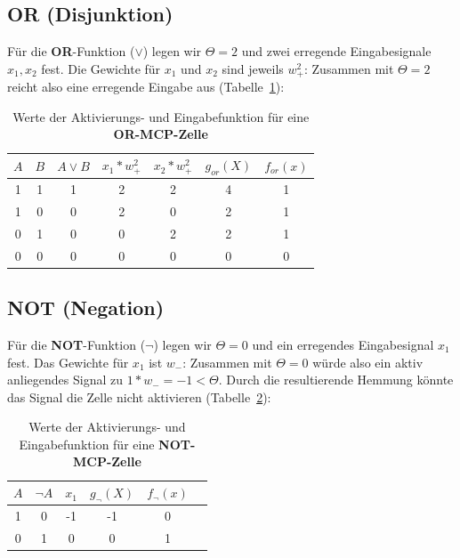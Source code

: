 {\subsection*{OR (Disjunktion)}

Für die \textbf{OR}-Funktion ($\lor$) legen wir $\Theta = 2$ und zwei erregende Eingabesignale $x_1, x_2$ fest. Die Gewichte für $x_1$ und $x_2$ sind jeweils $w^2_+$: Zusammen mit $\Theta = 2$ reicht also eine erregende Eingabe aus (Tabelle~\ref{tab:mcp-or}):


\begin{table} %
    \centering
    \begin{tabular}{c | c | c |c | c | c|c}
 $A$ & $B$ & $A \lor B$ & $x_1*w^2_+$ & $x_2*w^2_+$ & $g_{or}(X)$ & $f_{or}(x)$ \\
\hline
 1   & 1   & 1          & 2     & 2     & 4           & 1            \\
 1   & 0   & 0          & 2     & 0     & 2           & 1            \\
 0   & 1   & 0          & 0     & 2     & 2           & 1            \\
 0   & 0   & 0          & 0     & 0     & 0           & 0            \\
\end{tabular}
\caption{Werte der Aktivierungs- und Eingabefunktion für eine \textbf{OR-MCP-Zelle}}
\label{tab:mcp-or}
\end{table}

\subsection*{NOT (Negation)}

Für die \textbf{NOT}-Funktion ($\neg$) legen wir $\Theta = 0$ und ein erregendes Eingabesignal $x_1$ fest. Das Gewichte für $x_1$ ist $w_-$: Zusammen mit $\Theta = 0$ würde also ein aktiv anliegendes Signal zu $1 * w_-=-1 < \Theta$. Durch die resultierende Hemmung könnte das Signal die Zelle nicht aktivieren (Tabelle~\ref{tab:mcp-neg}):


\begin{table} %
    \centering
    \begin{tabular}{c | c | c |c | c | c}
        $A$ & $\neg A$ & $x_1$ & $g_{\neg}(X)$ & $f_{\neg}(x)$  \\
        \hline
         1   & 0        & -1     &  -1             & 0             \\
         0   & 1        & 0     &  0             &  1             \\
    \end{tabular}
    \caption{Werte der Aktivierungs- und Eingabefunktion für eine \textbf{NOT-MCP-Zelle}}
    \label{tab:mcp-neg}
\end{table}


}
